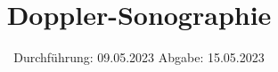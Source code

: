 

\subject{US3}
\title{Doppler-Sonographie}
\date{%
  Durchführung: 09.05.2023
  \hspace{3em}
  Abgabe: 15.05.2023
}



\maketitle
\thispagestyle{empty}
\tableofcontents
\newpage







\printbibliography{}


